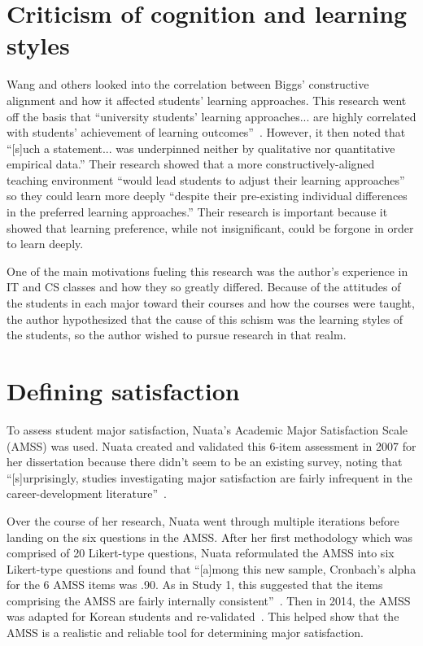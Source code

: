 \section{Criticism of cognition and learning styles}
Wang and others looked into the correlation between Biggs' constructive alignment and how it affected students' learning approaches. This research went off the basis that ``university students' learning approaches... are highly correlated with students' achievement of learning outcomes''~\citep{wang2013}. However, it then noted that ``[s]uch a statement... was underpinned neither by qualitative nor quantitative empirical data.'' Their research showed that a more constructively-aligned teaching environment ``would lead students to adjust their learning approaches'' so they could learn more deeply ``despite their pre-existing individual differences in the preferred learning approaches.'' Their research is important because it showed that learning preference, while not insignificant, could be forgone in order to learn deeply.

One of the main motivations fueling this research was the author's experience in IT and CS classes and how they so greatly differed. Because of the attitudes of the students in each major toward their courses and how the courses were taught, the author hypothesized that the cause of this schism was the learning styles of the students, so the author wished to pursue research in that realm.

\section{Defining satisfaction}
To assess student major satisfaction, Nuata's Academic Major Satisfaction Scale (AMSS) was used. Nuata created and validated this 6-item assessment in 2007 for her dissertation because there didn't seem to be an existing survey, noting that ``[s]urprisingly, studies investigating major satisfaction are fairly infrequent in the career-development literature''~\citep{nuata2007}.

Over the course of her research, Nuata went through multiple iterations before landing on the six questions in the AMSS. After her first methodology which was comprised of 20 Likert-type questions, Nuata reformulated the AMSS into six Likert-type questions and found that ``[a]mong this new sample, Cronbach's alpha for the 6 AMSS items was .90. As in Study 1, this suggested that the items comprising the AMSS are fairly internally consistent''~\citep{nuata2007}. Then in 2014, the AMSS was adapted for Korean students and re-validated~\citep{sovet2014}. This helped show that the AMSS is a realistic and reliable tool for determining major satisfaction.


